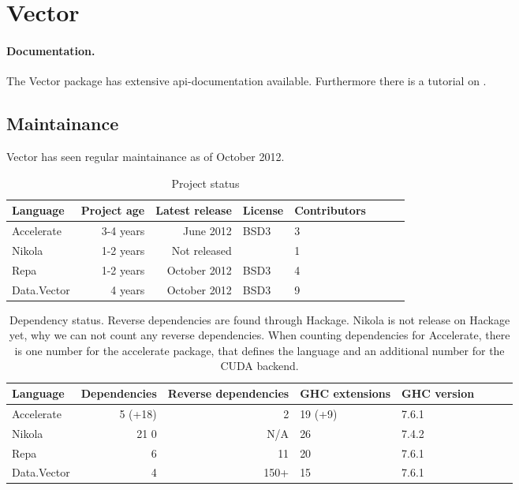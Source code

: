 \section{Vector}

\paragraph{Documentation.} The Vector package has extensive api-documentation
available. Furthermore there is a tutorial on
\cite{homepage:haskell:vectortutorial}.

\subsection{Maintainance} Vector has seen regular maintainance as of October 2012.

\begin{table}
  \centering
  \begin{tabular}{l|rrllllr}
    Language    & Project age & Latest release & License & Contributors \\ \hline
    Accelerate  & 3-4 years   & June 2012      & BSD3    & 3 \\
    Nikola      & 1-2 years   & Not released   & \todo{???}    & 1 \\
    Repa        & 1-2 years   & October 2012   & BSD3    & 4 \\
    Data.Vector & 4 years     & October 2012   & BSD3    & 9 \\
  \end{tabular}
  \caption{Project status}
  \label{tab:project_status}
\end{table}

\begin{table}
  \centering
  \begin{tabular}{l|rrllllr}
    Language    & Dependencies & Reverse dependencies & GHC extensions & GHC version \\ \hline
    Accelerate  & 5 (+18)      & 2                    & 19 (+9)        & 7.6.1 \\
    Nikola      & 21 0         & N/A                  & 26             & 7.4.2 \\
    Repa        & 6            & 11                   & 20             & 7.6.1 \\
    Data.Vector & 4            & 150+                 & 15             & 7.6.1 \\
  \end{tabular}
  \caption{Dependency status. Reverse dependencies are found through Hackage. 
    Nikola is not release on Hackage yet, why we can not count any reverse dependencies.
    When counting dependencies for Accelerate, there is one number for 
    the accelerate package, that defines the language and an additional number for the CUDA backend.}
  \label{tab:dependency_status}
\end{table}


